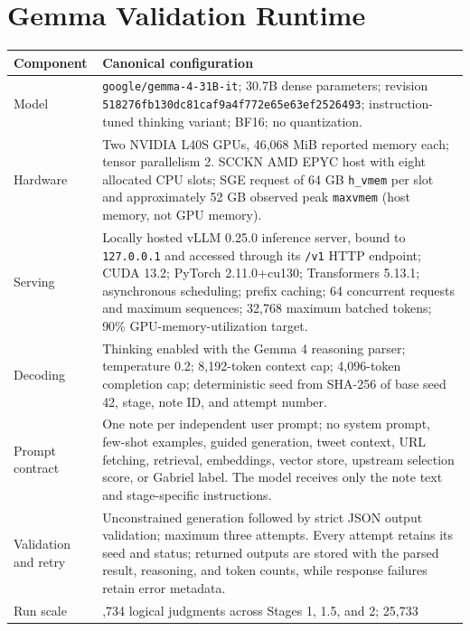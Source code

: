 \documentclass[10pt,twocolumn]{article}
\begin{document}



\onecolumn
\appendix
\section{Gemma Validation Runtime}
\label{app:gemma-runtime}

\begin{table}[ht]
\centering
\small
\begin{tabularx}{\textwidth}{@{}p{2.7cm}>{\raggedright\arraybackslash}X@{}}
\toprule
\textbf{Component} & \textbf{Canonical configuration} \\
\midrule
Model & \texttt{google/gemma-4-31B-it}; 30.7B dense parameters; revision
\texttt{518276fb130dc81caf9a4f772e65e63ef2526493}; instruction-tuned thinking
variant; BF16; no quantization. \\
Hardware & Two NVIDIA L40S GPUs, 46,068 MiB reported memory each; tensor
parallelism 2. SCCKN AMD EPYC host with eight allocated CPU slots; SGE request
of 64 GB \texttt{h\_vmem} per slot and approximately 52 GB observed peak
\texttt{maxvmem} (host memory, not GPU memory). \\
Serving & Locally hosted vLLM 0.25.0 inference server, bound to
\texttt{127.0.0.1} and accessed through its \texttt{/v1} HTTP endpoint; CUDA
13.2; PyTorch 2.11.0+cu130; Transformers 5.13.1; asynchronous scheduling;
prefix caching; 64 concurrent requests and maximum sequences; 32,768 maximum
batched tokens; 90\% GPU-memory-utilization target. \\
Decoding & Thinking enabled with the Gemma 4 reasoning parser; temperature
0.2; 8,192-token context cap; 4,096-token completion cap; deterministic seed
from SHA-256 of base seed 42, stage, note ID, and attempt number. \\
Prompt contract & One note per independent user prompt; no system prompt,
few-shot examples, guided generation, tweet context, URL fetching, retrieval,
embeddings, vector store, upstream selection score, or Gabriel label. The model
receives only the note text and stage-specific instructions. \\
Validation and retry & Unconstrained generation followed by strict JSON output
validation; maximum three attempts. Every attempt retains its seed and status;
returned outputs are stored with the parsed result, reasoning, and token counts,
while response failures retain error metadata. \\
Run scale & 25,734 logical judgments across Stages 1, 1.5, and 2; 25,733

\end{tabularx}
\end{table}
\end{document}
